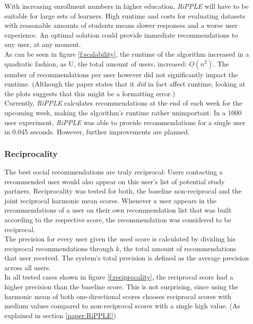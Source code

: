 \documentclass[conference]{IEEEtran}
\begin{document}
With increasing enrollment numbers in higher education, \textit{RiPPLE} will have to be suitable for large sets of learners. High runtime and costs for evaluating datasets with reasonable amounts of students means slower responses and a worse user experience. An optimal solution could provide immediate recommendations to any user, at any moment.\\
As can be seen in figure \ref{f:scalability}, the runtime of the algorithm increased in a quadratic fashion, as U, the total amount of users, increased: \(O(n^2)\). The number of recommendations per user however did not significantly impact the runtime. (Although the paper states that it \textit{did} in fact affect runtime, looking at the plots suggests that this might be a formatting error.)\\
Currently, \textit{RiPPLE} calculates recommendations at the end of each week for the upcoming week, making the algorithm's runtime rather unimportant. In a 1000 user experiment, \textit{RiPPLE} was able to provide recommendations for a single user in 0.045 seconds. However, further improvements are planned.\\

\subsubsection{Reciprocality} \label{paper:reciprocality}
The best social recommendations are truly reciprocal: Users contacting a recommended user would also appear on this user's list of potential study partners. \cite{prabhakar2017reciprocal} Reciprocality was tested for both, the baseline non-reciprocal and the joint reciprocal harmonic mean scores. Whenever a user appears in the recommendations of a user on their own recommendation list that was built according to the respective score, the recommendation was considered to be reciprocal.\\
The precision for every user given the used score is calculated by dividing his reciprocal recommendations through \(k\), the total amount of recommendations that user received. The system's total precision is defined as the average precision across all users. \cite{prabhakar2017reciprocal}\\ 
In all tested cases shown in figure \ref{f:reciprocality}, the reciprocal score had a higher precision than the baseline score. This is not surprising, since using the harmonic mean of both one-directional scores chooses reciprocal scores with medium values compared to non-reciprocal scores with a single high value. (As explained in section \ref{paper:RiPPLE})\\
\end{document}
